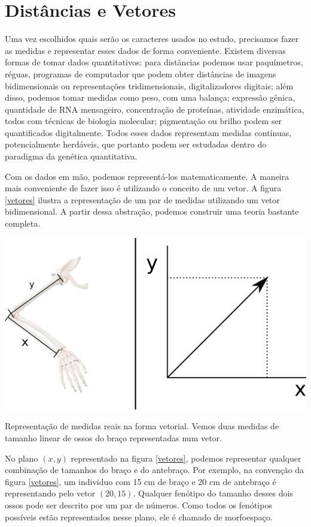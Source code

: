 \documentclass[portuges,]{tufte-handout}
\begin{document}
\section{Distâncias e Vetores}\label{distuxe2ncias-e-vetores}

Uma vez escolhidos quais serão os caracteres usados no estudo,
precisamos fazer as medidas e representar esses dados de forma
conveniente. Existem diversas formas de tomar dados quantitativos: para
distâncias podemos usar paquímetros, réguas, programas de computador que
podem obter distâncias de imagens bidimensionais ou representações
tridimensionais, digitalizadores digitais; além disso, podemos tomar
medidas como peso, com uma balança; expressão gênica, quantidade de RNA
mensageiro, concentração de proteínas, atividade enzimática, todos com
técnicas de biologia molecular; pigmentação ou brilho podem ser
quantificados digitalmente. Todos esses dados representam medidas
contínuas, potencialmente herdáveis, que portanto podem ser estudadas
dentro do paradigma da genética quantitativa.

Com os dados em mão, podemos representá-los matematicamente. A maneira
mais conveniente de fazer isso é utilizando o conceito de um vetor. A
figura \ref{vetores} ilustra a representação de um par de medidas
utilizando um vetor bidimensional. A partir dessa abstração, podemos
construir uma teoria bastante completa.

\begin{marginfigure}
\includegraphics{./figuras/medidas-vetores.png}
\caption{Representação de medidas reais na forma vetorial.
Vemos duas medidas de tamanho linear de ossos do braço representadas num
vetor.}
\label{vetores}
\end{marginfigure}

No plano $(x,y)$ representado na figura \ref{vetores}, podemos
representar qualquer combinação de tamanhos do braço e do antebraço. Por
exemplo, na convenção da figura \ref{vetores}, um individuo com 15 cm de
braço e 20 cm de antebraço é representando pelo vetor $(20, 15)$.
Qualquer fenótipo do tamanho desses dois ossos pode ser descrito por um
par de números. Como todos os fenótipos possíveis estão representados
nesse plano, ele é chamado de morfoespaço.
\end{document}
